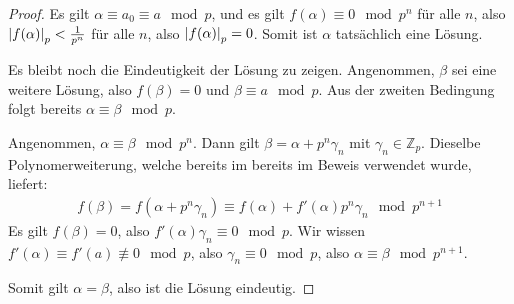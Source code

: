 \documentclass{report}
\newcommand*{\newpar}{\par\vspace{\baselineskip}\noindent}
\newcommand{\bZ}{\mathbb{Z}}
\begin{document}
\begin{proof}
	\newpar
	Es gilt $\alpha \equiv a_0 \equiv a \mod p$, und es gilt $f(\alpha) \equiv 0 \mod p^n$ für alle $n$, also $\abs{f(\alpha)}_p < \frac{1}{p^n}$ für alle $n$, also $\abs{f(\alpha)}_p = 0$. Somit ist $\alpha$ tatsächlich eine Lösung.
	\newpar
	Es bleibt noch die Eindeutigkeit der Lösung zu zeigen. Angenommen, $\beta$ sei eine weitere Lösung, also $f(\beta) = 0$ und $\beta \equiv a \mod p$. Aus der zweiten Bedingung folgt bereits $\alpha \equiv \beta \mod p$.
	\newpar
	Angenommen, $\alpha \equiv \beta \mod p^n$. Dann gilt $\beta = \alpha + p^n \gamma_n$ mit $\gamma_n \in \bZ_p$. Dieselbe Polynomerweiterung, welche bereits im bereits im Beweis verwendet wurde, liefert:
	\begin{align*}
		f(\beta) = f(\alpha + p^n \gamma_n) \equiv f(\alpha) + f'(\alpha)p^n\gamma_n \mod p^{n + 1}
	\end{align*}
	Es gilt $f(\beta) = 0$, also $f'(\alpha)\gamma_n \equiv 0 \mod p$. Wir wissen $f'(\alpha) \equiv f'(a) \not \equiv 0 \mod p$, also $\gamma_n \equiv 0 \mod p$, also $\alpha \equiv \beta \mod p^{n + 1}$.
	\newpar
	Somit gilt $\alpha = \beta$, also ist die Lösung eindeutig.
	\end{proof}
	\clearpage
\end{document}
